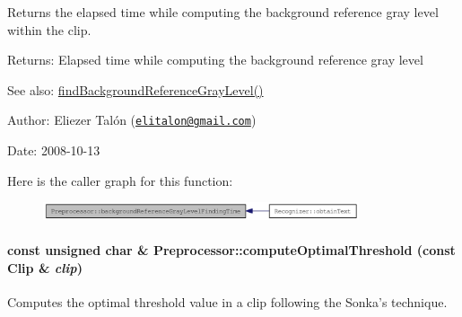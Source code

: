 Returns the elapsed time while computing the background reference gray level within the clip. 

\begin{Desc}
\item[Returns:]Elapsed time while computing the background reference gray level\end{Desc}
\begin{Desc}
\item[See also:]\hyperlink{class_preprocessor_a941f81382bd8e235e4dd12481342be4}{findBackgroundReferenceGrayLevel()}\end{Desc}
\begin{Desc}
\item[Author:]Eliezer Talón (\href{mailto:elitalon@gmail.com}{\tt elitalon@gmail.com}) \end{Desc}
\begin{Desc}
\item[Date:]2008-10-13 \end{Desc}


Here is the caller graph for this function:\nopagebreak
\begin{figure}[H]
\begin{center}
\leavevmode
\includegraphics[width=264pt]{class_preprocessor_001ec84b94a5d92a2bce6b854b4d3e7d_icgraph}
\end{center}
\end{figure}
\hypertarget{class_preprocessor_ac2f414d6f4f917419f33f6067eb8634}{
\paragraph[{computeOptimalThreshold}]{\setlength{\rightskip}{0pt plus 5cm}const unsigned char \& Preprocessor::computeOptimalThreshold (const {\bf Clip} \& {\em clip})}\hfill}
\label{class_preprocessor_ac2f414d6f4f917419f33f6067eb8634}


Computes the optimal threshold value in a clip following the Sonka's technique. 

